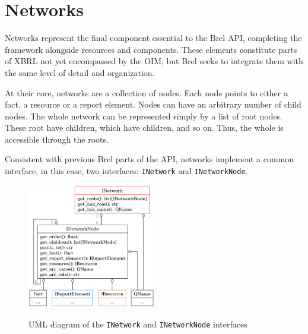 \section{Networks}
\label{sec:api_networks}

Networks represent the final component essential to the Brel API, completing the framework alongside resources and components. 
These elements constitute parts of XBRL not yet encompassed by the OIM, 
but Brel seeks to integrate them with the same level of detail and organization.

At their core, networks are a collection of nodes.
Each node points to either a fact, a resource or a report element.
Nodes can have an arbitrary number of child nodes.
The whole network can be represented simply by a list of root nodes.
These root have children, which have children, and so on.
Thus, the whole is accessible through the roots.

Consistent with previous Brel parts of the API, networks implement a common interface, 
in this case, two interfaces: \texttt{INetwork} and \texttt{INetworkNode}.


\begin{figure}[H]
    \centering
    \caption{UML diagram of the \texttt{INetwork} and \texttt{INetworkNode} interfaces}
    \includegraphics[width=0.5\textwidth]{images/brel_network_interfaces.png}
    \label{fig:brel_network_interfaces}
\end{figure}

